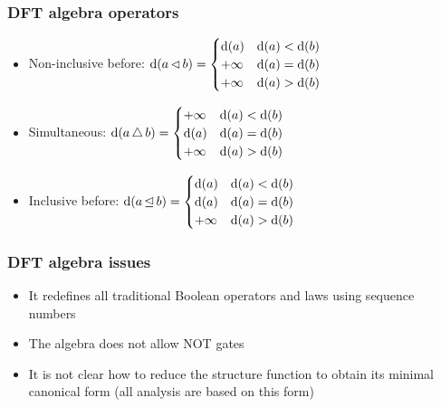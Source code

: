 \begin{frame}
\frametitle{DFT algebra operators}

\begin{itemize}
  \item Non-inclusive before:
  $
  \operatorname{d} (a \operatorname{\lhd} b) =
  \begin{cases}
  \operatorname{d}(a) & \operatorname{d}(a) < \operatorname{d}(b)\\
  +\infty & \operatorname{d}(a) = \operatorname{d}(b)\\
  +\infty & \operatorname{d}(a) > \operatorname{d}(b)\\
  \end{cases}
  $
  \item Simultaneous:
  $
  \operatorname{d} (a \operatorname{\triangle} b) =
  \begin{cases}
  +\infty & \operatorname{d}(a) < \operatorname{d}(b)\\
  \operatorname{d}(a) & \operatorname{d}(a) = \operatorname{d}(b)\\
  +\infty & \operatorname{d}(a) > \operatorname{d}(b)\\
  \end{cases}
  $
  \item Inclusive before:
  $
  \operatorname{d} (a \operatorname{\unlhd} b) =
  \begin{cases}
  \operatorname{d}(a) & \operatorname{d}(a) < \operatorname{d}(b)\\
  \operatorname{d}(a) & \operatorname{d}(a) = \operatorname{d}(b)\\
  +\infty & \operatorname{d}(a) > \operatorname{d}(b)\\
  \end{cases}
  $
\end{itemize}
\end{frame}

\begin{frame}
\frametitle{DFT algebra issues}

\begin{itemize}
  \item It redefines all traditional Boolean operators and laws using sequence numbers 
  \item The algebra does not allow NOT gates
  \item It is not clear how to reduce the structure function to obtain its minimal canonical form (all analysis are based on this form)
\end{itemize}
\end{frame}